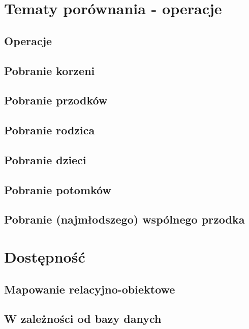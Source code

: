 \documentclass[10pt,a4paper,oneside]{book}
\begin{document}
\section{Tematy porównania - operacje}



\subsection{Operacje}
\subsection{Pobranie korzeni}
\subsection{Pobranie przodków}
\subsection{Pobranie rodzica}
\subsection{Pobranie dzieci}
\subsection{Pobranie potomków}
\subsection{Pobranie (najmłodszego) wspólnego przodka}




\section{Dostępność}
\subsection{Mapowanie relacyjno-obiektowe}
\subsection{W zależności od bazy danych}
\end{document}
